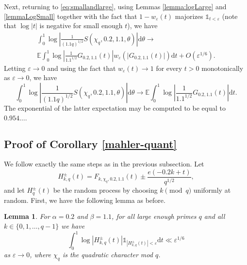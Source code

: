\documentclass[12pt, a4paper]{amsart}
\newtheorem{lemma}{Lemma}
\theoremstyle{remark}
\newcommand{\ud}{\mathrm{d}}
\newcommand{\abs}[1]{\left|#1\right|}
\begin{document}
Next, returning to \eqref{eq:smallandlarge}, using Lemmas \ref{lemma:logLarge} and \ref{lemmaLogSmall} together with the fact that $1-w_{\varepsilon}(t)$ majorizes $\mathds 1_{t<\varepsilon}$ (note that $\log\lvert t\rvert$ is negative for small enough $t$), we have
\begin{multline*}
    \int_0^1 \log\abs{ \frac{1}{(1.1q)^{1/2}} S(\chi_q, 0.2, 1.1, \theta)}\ud\theta
        \longrightarrow 
        \\ \mathbb E\int_0^1 \log \abs{\frac{1}{1.1^{1/2}} G_{0.2, 1.1}(t)}w_{\varepsilon}(\lvert G_{0.2, 1.1}(t)\rvert)\ud t+O(\varepsilon^{1/6}).
\end{multline*}
Letting $\varepsilon\to 0$ and using the fact that $w_{\varepsilon}(t)\to 1$ for every $t>0$ monotonically as $\varepsilon\to 0$, we have 
\begin{equation}\nonumber
    \int_0^1 \log\abs{\frac{1}{(1.1q)^{1/2}} S(\chi_q, 0.2, 1.1, \theta)}\ud\theta
        \longrightarrow \mathbb E\int_0^1 \log \abs{\frac{1}{1.1^{1/2}} G_{0.2, 1.1}(t)}\ud t.
\end{equation} 
The exponential of the latter expectation may be computed to be equal to $0.954\ldots$. 



\subsection{Proof of Corollary \ref{mahler-quant}}
We follow exactly the same steps as in the previous subsection. Let 
\begin{equation}\nonumber
    H^{\pm}_{k, q}(t) = F_{k, \chi_q, 0.2, 1.1}(t) \pm \frac{e(-0.2k+t)}{q^{1/2}},
\end{equation}
and let $H^{\pm}_q(t)$ be the random process by choosing $k\pmod q$ uniformly at random. First, we have the following lemma as before.

\begin{lemma}\label{lemmaLogSmall2}
    For $\alpha=0.2$ and $\beta = 1.1$, for all large enough primes $q$ and all
    $k \in \{0, 1, \ldots, q-1\}$ we have
\[
    \int_0^1 \log \abs{H_{k, q}^{\pm}(t)}\mathds{1}_{\abs{H_{k, q}^{\pm}(t)}
        < \varepsilon} \ud t \ll \varepsilon^{1/6}
\]
    as $\varepsilon \rightarrow 0$, where $\chi_q$ is the quadratic character mod $q$.
\end{lemma}
\end{document}
